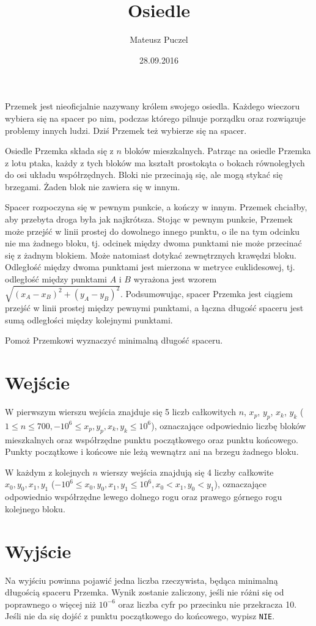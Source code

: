 \documentclass[zad,zawodnik,utf8]{sinol}
\title{Osiedle}
\author{Mateusz Puczel} %
\date{28.09.2016}
\begin{document}
\begin{tasktext}%
Przemek jest nieoficjalnie nazywany królem swojego osiedla. Każdego wieczoru wybiera się na spacer po nim, podczas którego pilnuje porządku
oraz rozwiązuje problemy innych ludzi. Dziś Przemek też wybierze się na spacer.

Osiedle Przemka składa się z $n$ bloków mieszkalnych. Patrząc na osiedle Przemka z lotu ptaka, każdy z tych bloków ma kształt prostokąta o
bokach równoległych do osi układu współrzędnych. Bloki nie przecinają się, ale mogą stykać się brzegami. Żaden blok nie zawiera się w innym.

Spacer rozpoczyna się w pewnym punkcie, a kończy w innym. Przemek chciałby, aby przebyta droga była jak najkrótsza.
Stojąc w pewnym punkcie, Przemek może przejść w linii prostej do dowolnego innego punktu, o ile na tym odcinku nie ma żadnego bloku, tj.
odcinek między dwoma punktami nie może przecinać się z żadnym blokiem. Może natomiast dotykać zewnętrznych krawędzi bloku. Odległość
między dwoma punktami jest mierzona w metryce euklidesowej, tj. odległość między punktami $A$ i $B$ wyrażona jest wzorem $\sqrt{(x_A - x_B)^2 + (y_A - y_B)^2}$.
Podsumowując, spacer Przemka jest ciągiem przejść w linii prostej między pewnymi punktami, a łączna długość spaceru jest sumą odległości między
kolejnymi punktami.

Pomoż Przemkowi wyznaczyć minimalną długość spaceru.

  \section{Wejście}
W pierwszym wierszu wejścia znajduje się 5 liczb całkowitych $n$, $x_p$, $y_p$, $x_k$, $y_k$ ($1 \leq n \leq 700, -10^6 \leq x_p, y_p, x_k, y_k \leq 10^6$),
oznaczające odpowiednio liczbę bloków mieszkalnych oraz współrzędne punktu początkowego oraz punktu końcowego. Punkty początkowe i końcowe nie leżą wewnątrz ani na brzegu
żadnego bloku.

W każdym z kolejnych $n$ wierszy wejścia znajdują się 4 liczby całkowite $x_0, y_0, x_1, y_1$ ($-10^6 \leq x_0, y_0, x_1, y_1 \leq 10^6, x_0 < x_1, y_0 < y_1$),
oznaczające odpowiednio współrzędne lewego dolnego rogu oraz prawego górnego rogu kolejnego bloku.
  
  \section{Wyjście}
Na wyjściu powinna pojawić jedna liczba rzeczywista, będąca minimalną długością spaceru Przemka. Wynik zostanie zaliczony, jeśli nie różni się
od poprawnego o więcej niż $10^{-6}$ oraz liczba cyfr po przecinku nie przekracza 10. Jeśli nie da się dojść z punktu początkowego do końcowego, wypisz \texttt{NIE}.
\makecompactexample

\end{tasktext}
\end{document}
